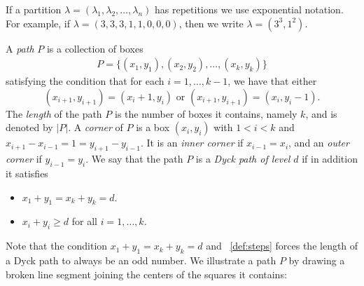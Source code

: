 \documentclass[12pt]{amsart}
\theoremstyle{definition}
\theoremstyle{remark}
\numberwithin{equation}{section}
\begin{document}
If a partition $\lambda = (\lambda_1,\lambda_2,\ldots,\lambda_n)$ has repetitions we use exponential notation. For example, if $\lambda = (3,3,3,1,1,0,0,0)$, then we write $\lambda = (3^3,1^2)$.

A \emph{path} $P$ is a collection of boxes
\begin{align} \label{def:path}
    P = \{ (x_1,y_1),(x_2,y_2),\ldots,(x_k,y_k) \}
\end{align}
satisfying the condition that for each $i = 1,\ldots,k-1$, we have that either
\begin{equation} \label{def:steps}
    (x_{i+1},y_{i+1}) = (x_i + 1,y_i) \text{ or } (x_{i+1},y_{i+1}) = (x_i,y_i-1).
\end{equation}
The \emph{length} of the path $P$ is the number of boxes it contains, namely $k$, and is denoted by $|P|$. A \emph{corner} of $P$ is a box $(x_i,y_i)$ with $1 < i < k$ and $x_{i+1} - x_{i-1} = 1 = y_{i+1} - y_{i-1}$. It is an \emph{inner corner} if $x_{i-1} = x_i$, and an \emph{outer corner} if $y_{i-1} = y_i$. We say that the path $P$ is a \emph{Dyck path of level $d$} if in addition it satisfies
\begin{itemize}
    \item $x_1 + y_1 = x_k + y_k = d$.
    \item $x_i + y_i \geq d$ for all $i = 1,\ldots,k$.
\end{itemize}
Note that the condition $x_1 + y_1 = x_k + y_k = d$ and ~\ref{def:steps} forces the length of a Dyck path to always be an odd number. We illustrate a path $P$ by drawing a broken line segment joining the centers of the squares it contains:
\end{document}
